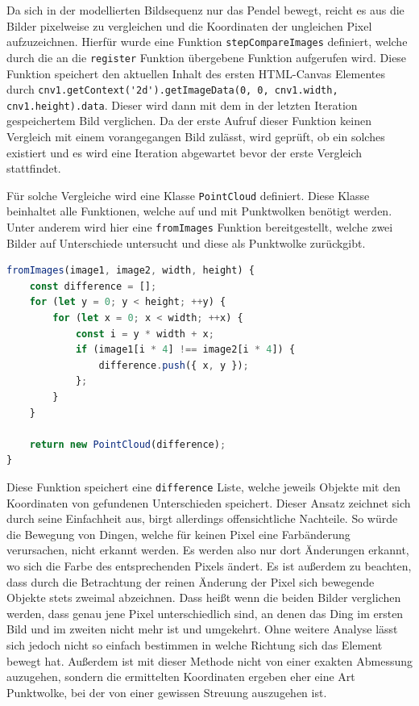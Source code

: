 Da sich in der modellierten Bildsequenz nur das Pendel bewegt, reicht es aus die Bilder pixelweise zu vergleichen und die Koordinaten der ungleichen Pixel aufzuzeichnen.
Hierfür wurde eine Funktion \lstinline{stepCompareImages} definiert, welche durch die an die \lstinline{register} Funktion übergebene Funktion aufgerufen wird.
Diese Funktion speichert den aktuellen Inhalt des ersten HTML-Canvas Elementes durch \lstinline{cnv1.getContext('2d').getImageData(0, 0, cnv1.width, cnv1.height).data}.
Dieser wird dann mit dem in der letzten Iteration gespeichertem Bild verglichen.
Da der erste Aufruf dieser Funktion keinen Vergleich mit einem vorangegangen Bild zulässt, wird geprüft, ob ein solches existiert und es wird eine Iteration abgewartet bevor der erste Vergleich stattfindet.

Für solche Vergleiche wird eine Klasse \lstinline{PointCloud} definiert.
Diese Klasse beinhaltet alle Funktionen, welche auf und mit Punktwolken benötigt werden.
Unter anderem wird hier eine \lstinline{fromImages} Funktion bereitgestellt, welche zwei Bilder auf Unterschiede untersucht und diese als Punktwolke zurückgibt.

\begin{lstlisting}[language=JavaScript, caption={Definition der \lstinline{fromImages} Funktion, welche eine statische Funktion der \lstinline{PointCloud} Klasse darstellt.}, label={lst:PointCloud}]
fromImages(image1, image2, width, height) {
    const difference = [];
    for (let y = 0; y < height; ++y) {
        for (let x = 0; x < width; ++x) {
            const i = y * width + x;
            if (image1[i * 4] !== image2[i * 4]) {
                difference.push({ x, y });
            };
        }
    }

    return new PointCloud(difference);
}
\end{lstlisting}

Diese Funktion speichert eine \lstinline{difference} Liste, welche jeweils Objekte mit den Koordinaten von gefundenen Unterschieden speichert.
Dieser Ansatz zeichnet sich durch seine Einfachheit aus, birgt allerdings offensichtliche Nachteile.
So würde die Bewegung von Dingen, welche für keinen Pixel eine Farbänderung verursachen, nicht erkannt werden.
Es werden also nur dort Änderungen erkannt, wo sich die Farbe des entsprechenden Pixels ändert.
Es ist au{\ss}erdem zu beachten, dass durch die Betrachtung der reinen Änderung der Pixel sich bewegende Objekte stets zweimal abzeichnen.
Dass hei{\ss}t wenn die beiden Bilder verglichen werden, dass genau jene Pixel unterschiedlich sind, an denen das Ding im ersten Bild und im zweiten nicht mehr ist und umgekehrt.
Ohne weitere Analyse lässt sich jedoch nicht so einfach bestimmen in welche Richtung sich das Element bewegt hat.
Au{\ss}erdem ist mit dieser Methode nicht von einer exakten Abmessung auzugehen, sondern die ermittelten Koordinaten ergeben eher eine Art Punktwolke, bei der von einer gewissen Streuung auszugehen ist.

